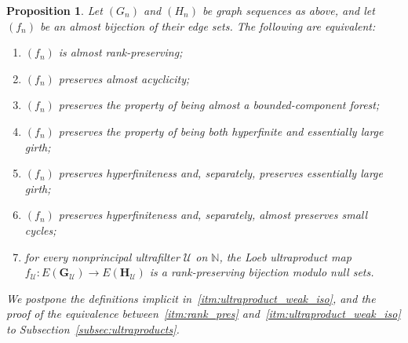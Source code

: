 \documentclass{article}
\theoremstyle{plain}
\newtheorem{prop}[thm]{Proposition}
\theoremstyle{definition}
\newcommand{\N}{\mathbb{N}}
\newcommand{\cU}{\mathcal{U}}
\begin{document}
\begin{prop}\label{prop:almost_rank_pres_characterization}
Let $(G_n)$ and $(H_n)$ be graph sequences as above, and let $(f_n)$ be an almost bijection of their edge sets. The following are equivalent:
\begin{enumerate}
    \item\label{itm:rank_pres} $(f_n)$ is almost rank-preserving;
    \item\label{itm:almost_acyc_pres} $(f_n)$ preserves almost acyclicity;
    \item\label{itm:almost_bbd_forest_pres} $(f_n)$ preserves the property of being almost a bounded-component forest;
    \item\label{itm:hyp_plus_ess_large_girth_pres} $(f_n)$ preserves the property of being both hyperfinite and essentially large girth;
    \item\label{itm:hyp_pres_plus_large_girth_pres} $(f_n)$ preserves hyperfiniteness and, separately, preserves essentially large girth; 
    \item\label{itm:almost_small_cycle_plus_hyp} $(f_n)$ preserves hyperfiniteness and, separately, almost preserves small cycles;
    
    \item\label{itm:ultraproduct_weak_iso} for every nonprincipal ultrafilter $\cU$ on $\N$, the Loeb ultraproduct map $f_\cU: E(\mathbf G_{\cU})\to E(\mathbf H_{\cU})$ is a rank-preserving bijection modulo null sets. \end{enumerate}
We postpone the definitions implicit in~\ref{itm:ultraproduct_weak_iso}, and the proof of the equivalence between~\ref{itm:rank_pres} and~\ref{itm:ultraproduct_weak_iso} to Subsection~\ref{subsec:ultraproducts}.
\end{prop}
\end{document}
